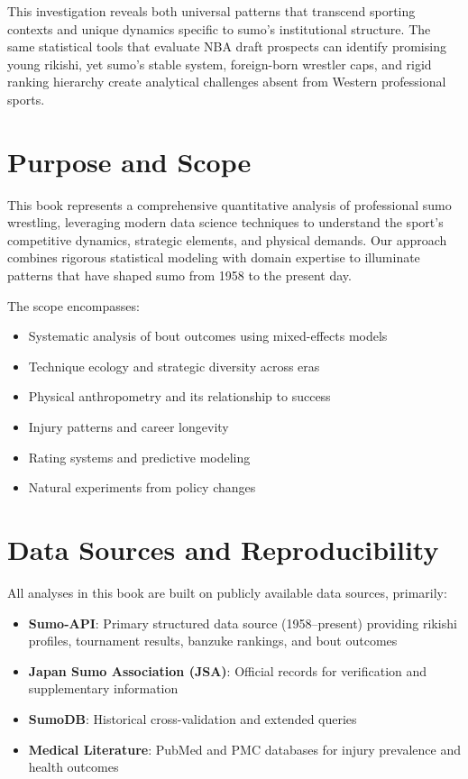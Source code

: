 This investigation reveals both universal patterns that transcend sporting contexts and unique dynamics specific to sumo's institutional structure. The same statistical tools that evaluate NBA draft prospects can identify promising young rikishi, yet sumo's stable system, foreign-born wrestler caps, and rigid ranking hierarchy create analytical challenges absent from Western professional sports.

\section*{Purpose and Scope}

This book represents a comprehensive quantitative analysis of professional sumo wrestling, leveraging modern data science techniques to understand the sport's competitive dynamics, strategic elements, and physical demands. Our approach combines rigorous statistical modeling with domain expertise to illuminate patterns that have shaped sumo from 1958 to the present day.

The scope encompasses:
\begin{itemize}
\item Systematic analysis of bout outcomes using mixed-effects models
\item Technique ecology and strategic diversity across eras
\item Physical anthropometry and its relationship to success
\item Injury patterns and career longevity
\item Rating systems and predictive modeling
\item Natural experiments from policy changes
\end{itemize}

\section*{Data Sources and Reproducibility}

All analyses in this book are built on publicly available data sources, primarily:

\begin{itemize}
\item \textbf{Sumo-API}: Primary structured data source (1958--present) providing rikishi profiles, tournament results, banzuke rankings, and bout outcomes
\item \textbf{Japan Sumo Association (JSA)}: Official records for verification and supplementary information
\item \textbf{SumoDB}: Historical cross-validation and extended queries
\item \textbf{Medical Literature}: PubMed and PMC databases for injury prevalence and health outcomes
\end{itemize}

